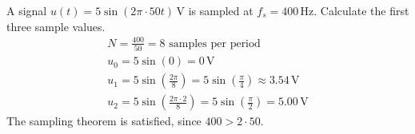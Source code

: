 \begin{exempel}
A signal $u(t) = 5\sin(2\pi \cdot 50t)\,\text{V}$ is sampled at $f_s = 400\,\text{Hz}$. Calculate
the first three sample values.
\begin{gather*}
  N = \frac{400}{50} = 8 \text{ samples per period} \\
  u_0 = 5\sin(0) = 0\,\text{V} \\
  u_1 = 5\sin\left(\frac{2\pi}{8}\right) = 5\sin\left(\frac{\pi}{4}\right) \approx
  3.54\,\text{V} \\
  u_2 = 5\sin\left(\frac{2\pi \cdot 2}{8}\right) = 5\sin\left(\frac{\pi}{2}\right) =
  5.00\,\text{V}
\end{gather*}
The sampling theorem is satisfied, since $400 > 2 \cdot 50$.
\end{exempel}

